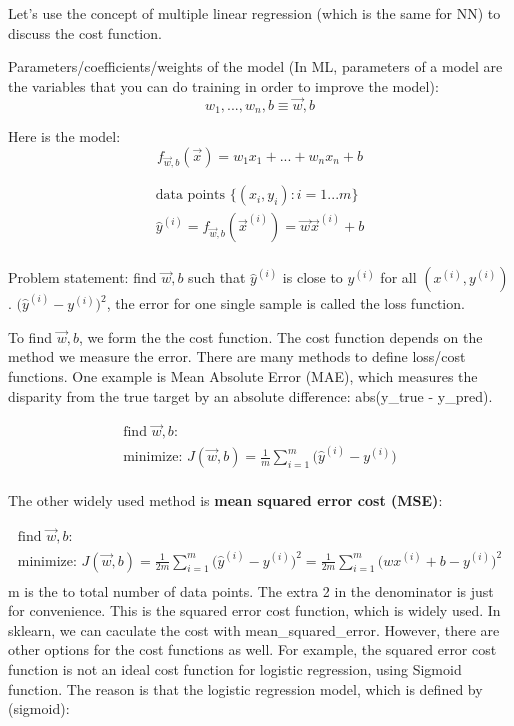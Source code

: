 \documentclass[12pt]{report}
\begin{document}
Let's use the concept of multiple linear regression (which is the same for NN) to discuss the cost function.

Parameters/coefficients/weights of the model (In ML, parameters of a model are the variables that you can do training in order to improve the model):
\begin{equation}
  w_1, . . . , w_n , b \equiv \overrightarrow{w} ,b
\end{equation}

Here is the model:
\begin{equation}
	f_{\overrightarrow{w},b} (\overrightarrow{x}) = w_1x_1 +  ... + w_nx_n + b
\end{equation}

\begin{multline}
		\text{data points } \{(x_i, y_i): i=1 ... m \} \\
    \hat{y}^{(i)} = f_{\overrightarrow{w},b} (\overrightarrow{x}^{(i)})  = \overrightarrow{w} \overrightarrow{x} ^ {(i)} + b \\
\end{multline}

Problem statement: find $\overrightarrow{w},b$ such that $\hat{y}^{(i)}$ is close to $y^{(i)}$ for all $(x^{(i)}, y^{(i)} )$. $\big(\hat{y}^{(i)}  - y^{(i)} \big) ^2$, the error for one single sample is called the loss function.

To find $\overrightarrow{w},b$, we form the the cost function. The cost function depends on the method we measure the error. There are many methods to define loss/cost functions. One example is Mean Absolute Error (MAE), which measures the disparity from the true target by an absolute difference: abs(y\_true - y\_pred).

\begin{multline}
  \text{find $\overrightarrow{w},b$:} \\
  \text{minimize:  }  J(\overrightarrow{w},b) = \frac{1}{m} \sum_{i=1}^{m} \big(\hat{y}^{(i)}  - y^{(i)} \big) \\
\end{multline}


The other widely used method is \textbf{mean squared error cost (MSE)}:

\begin{multline}
	\text{find $\overrightarrow{w},b$:} \\
	\text{minimize:  }  J(\overrightarrow{w},b) = \frac{1}{2m} \sum_{i=1}^{m} \big(\hat{y}^{(i)}  - y^{(i)} \big) ^2 = \frac{1}{2m} \sum_{i=1}^{m} \big( wx ^ {(i)} + b - y^{(i)} \big) ^2 \\
\end{multline}
m is the to total number of data points. The extra 2 in the denominator is just for convenience. This is the squared error cost function, which is widely used. In sklearn, we can caculate the cost with mean\_squared\_error. However, there are other options for the cost functions as well. For example, the squared error cost function is not an ideal cost function for logistic regression, using Sigmoid function. The reason is that the logistic regression model, which is defined by (sigmoid):
\end{document}
